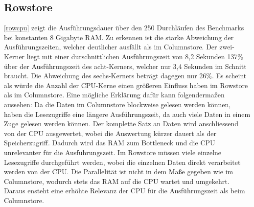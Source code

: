 \subsection{Rowstore}

\begin{figure}[H]
\end{figure}

\autoref{rowcpu} zeigt die Ausführungsdauer über den 250 Durchläufen des Benchmarks bei konstanten 8 Gigabyte RAM.
 Zu erkennen ist die starke Abweichung der Ausführungszeiten, welcher deutlicher ausfällt als im Columnstore. 
 Der zwei-Kerner liegt mit einer durschnittlichen Ausführungszeit von 8,2 Sekunden 137\% über der Ausführungszeit des acht-Kerners,
  welcher nur 3,4 Sekunden im Schnitt braucht. Die Abweichung des sechs-Kerners beträgt dagegen nur 26\%. 
Es scheint als würde die Anzahl der CPU-Kerne einen größeren Einfluss haben im Rowstore als im Columnstore.
 Eine mögliche Erklärung dafür kann folgendermaßen aussehen: 
Da die Daten im Columnstore blockweise gelesen werden können, haben die Lesezugriffe eine längere Ausführungszeit,
 da auch viele Daten in einem Zuge gelesen werden können. Der komplette Satz an Daten wird anschliessend von der CPU ausgewertet,
  wobei die Auswertung kürzer dauert als der Speicherzugriff. Dadurch wird das RAM zum Bottleneck und die CPU unrelevanter für die Ausführungszeit. 
Im Rowstore müssen viele einzelne Lesezugriffe durchgeführt werden, wobei die einzelnen Daten direkt
 verarbeitet werden von der CPU. Die Parallelität ist nicht in dem Maße gegeben wie im Columnstore, wodurch
  stets das RAM auf die CPU wartet und umgekehrt. Daraus ensteht eine erhöhte Relevanz der CPU für die Ausführungszeit als beim Columnstore. 

